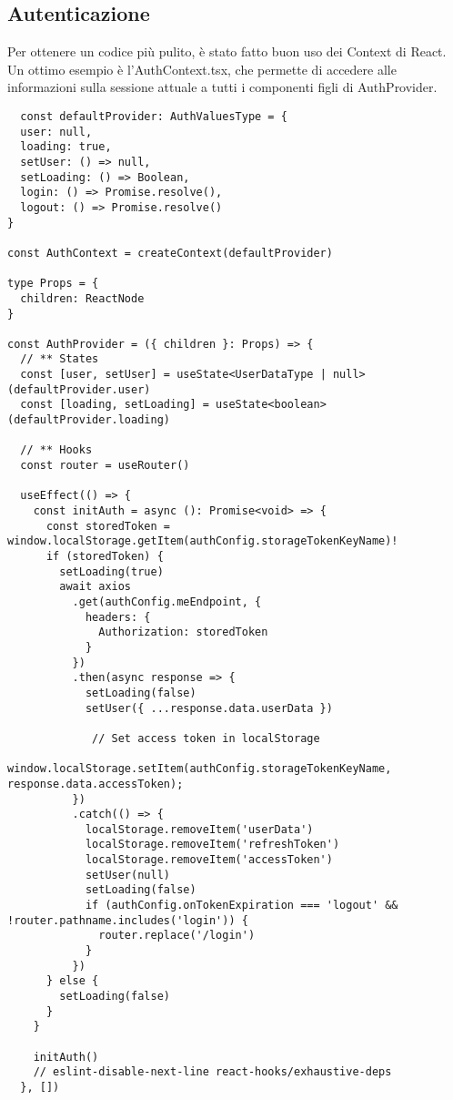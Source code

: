 \subsection*{Autenticazione}

Per ottenere un codice più pulito, è stato fatto buon uso dei Context di React. Un ottimo esempio è l'AuthContext.tsx, che permette di accedere alle informazioni sulla sessione attuale a tutti i componenti figli di AuthProvider.

\begin{verbatim}
  const defaultProvider: AuthValuesType = {
  user: null,
  loading: true,
  setUser: () => null,
  setLoading: () => Boolean,
  login: () => Promise.resolve(),
  logout: () => Promise.resolve()
}

const AuthContext = createContext(defaultProvider)

type Props = {
  children: ReactNode
}

const AuthProvider = ({ children }: Props) => {
  // ** States
  const [user, setUser] = useState<UserDataType | null>(defaultProvider.user)
  const [loading, setLoading] = useState<boolean>(defaultProvider.loading)

  // ** Hooks
  const router = useRouter()

  useEffect(() => {
    const initAuth = async (): Promise<void> => {
      const storedToken = window.localStorage.getItem(authConfig.storageTokenKeyName)!
      if (storedToken) {
        setLoading(true)
        await axios
          .get(authConfig.meEndpoint, {
            headers: {
              Authorization: storedToken
            }
          })
          .then(async response => {
            setLoading(false)
            setUser({ ...response.data.userData })

             // Set access token in localStorage
             window.localStorage.setItem(authConfig.storageTokenKeyName, response.data.accessToken);
          })
          .catch(() => {
            localStorage.removeItem('userData')
            localStorage.removeItem('refreshToken')
            localStorage.removeItem('accessToken')
            setUser(null)
            setLoading(false)
            if (authConfig.onTokenExpiration === 'logout' && !router.pathname.includes('login')) {
              router.replace('/login')
            }
          })
      } else {
        setLoading(false)
      }
    }

    initAuth()
    // eslint-disable-next-line react-hooks/exhaustive-deps
  }, [])


\end{verbatim}
